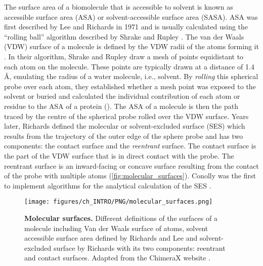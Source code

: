 The surface area of a biomolecule that is accessible to solvent is known as accessible surface area (ASA) or solvent-accessible surface area (SASA). ASA was first described by Lee and Richards in 1971 \cite{LEE_1971_ASA} and is usually calculated using the ``rolling ball'' algorithm described by Shrake and Rupley \cite{SHRAKE_1973_ASA}. The van der Waals (VDW) surface of a molecule is defined by the VDW radii of the atoms forming it \cite{1873_VANDERWAALS_VDW}. In their algorithm, Shrake and Rupley draw a mesh of points equidistant to each atom on the molecule. These points are typically drawn at a distance of 1.4 \AA{}, emulating the radius of a water molecule, i.e., solvent. By \textit{rolling} this spherical probe over each atom, they established whether a mesh point was exposed to the solvent or buried and calculated the individual contribution of each atom or residue to the ASA of a protein (). The ASA of a molecule is then the path traced by the centre of the spherical probe rolled over the VDW surface. Years later, Richards \cite{1977_RICHARDS_SSE} defined the molecular or solvent-excluded surface (SES) which results from the trajectory of the outer edge of the sphere probe and has two components: the contact surface and the \textit{reentrant} surface. The contact surface is the part of the VDW surface that is in direct contact with the probe. The reentrant surface is an inward-facing or concave surface resulting from the contact of the probe with multiple atoms (\autoref{fig:molecular_surfaces}). Conolly was the first to implement algorithms for the analytical calculation of the SES \cite{1983_CONNOLLY_SASA, 1983_CONNOLLY_SASA2}.

\begin{figure}[htb!]
    \centering
    \texttt{[image: figures/ch\_INTRO/PNG/molecular\_surfaces.png]}
    \caption[Molecular surfaces]{\textbf{Molecular surfaces.} Different definitions of the surfaces of a molecule including Van der Waals surface of atoms, solvent accessible surface area defined by Richards and Lee and solvent-excluded surface by Richards with its two components: reentrant and contact surfaces. Adapted from the ChimeraX website \cite{surface_diagram}.}
    \label{fig:molecular_surfaces}
\end{figure}

